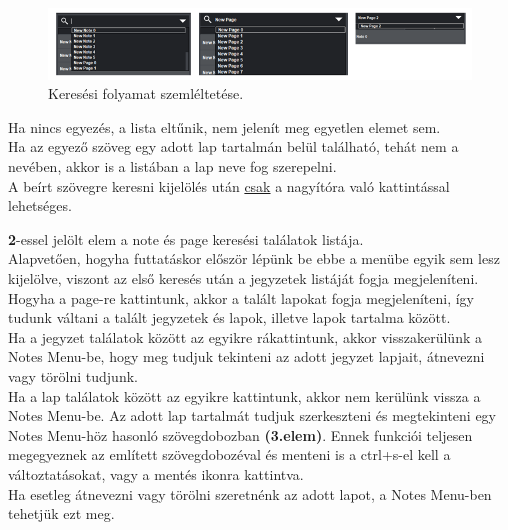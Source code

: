 \begin{figure}[h]
	\centering
	\includegraphics[scale=0.4]{images/doc_5.png}
	\caption{Keresési folyamat szemléltetése.}
	\label{fig:menu_search_searchBar}
\end{figure}
	
\vspace{5pt} \noindent Ha nincs egyezés, a lista eltűnik, nem jelenít meg egyetlen elemet sem.
\vspace{5pt} \\Ha az egyező szöveg egy adott lap tartalmán belül található, tehát nem a nevében, akkor is a listában a lap neve fog szerepelni.
\vspace{5pt} \\A beírt szövegre keresni kijelölés után \underline{csak} a nagyítóra való kattintással lehetséges.
	
	
\vspace{5pt} \noindent \textbf{2}-essel jelölt elem a note és page keresési találatok listája.
\vspace{5pt} \\Alapvetően, hogyha futtatáskor először lépünk be ebbe a menübe egyik sem lesz kijelölve, viszont az első keresés után a jegyzetek listáját fogja megjeleníteni. Hogyha a page-re kattintunk, akkor a talált lapokat fogja megjeleníteni, így tudunk váltani a talált jegyzetek és lapok, illetve lapok tartalma között.
\vspace{5pt} \\Ha a jegyzet találatok között az egyikre rákattintunk, akkor visszakerülünk a Notes Menu-be, hogy meg tudjuk tekinteni az adott jegyzet lapjait, átnevezni vagy törölni tudjunk.
\vspace{5pt} \\Ha a lap találatok között az egyikre kattintunk, akkor nem kerülünk vissza a Notes Menu-be. Az adott lap tartalmát tudjuk szerkeszteni és megtekinteni egy Notes Menu-höz hasonló szövegdobozban \textbf{(3.elem)}. Ennek funkciói teljesen megegyeznek az említett szövegdobozéval és menteni is a ctrl+s-el kell a változtatásokat, vagy a mentés ikonra kattintva.
\vspace{5pt} \\Ha esetleg átnevezni vagy törölni szeretnénk az adott lapot, a Notes Menu-ben tehetjük ezt meg.

